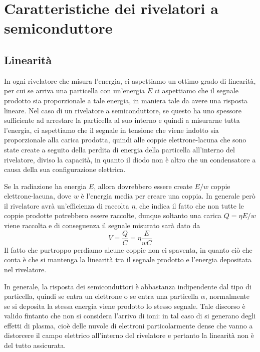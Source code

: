 \section{Caratteristiche dei rivelatori a semiconduttore}

\subsection{Linearità}
In ogni rivelatore che misura l'energia, ci aspettiamo un ottimo grado di linearità, per cui se arriva una particella con un'energia $E$ ci aspettiamo che il segnale prodotto sia proporzionale a tale energia, in maniera tale da avere una risposta lineare. Nel caso di un rivelatore a semiconduttore, se questo ha uno spessore sufficiente ad arrestare la particella al suo interno e quindi a misurarne tutta l'energia, ci aspettiamo che il segnale in tensione che viene indotto sia proporzionale alla carica prodotta, quindi alle coppie elettrone-lacuna che sono state create a seguito della perdita di energia della particella all'interno del rivelatore, diviso la capacità, in quanto il diodo non è altro che un condensatore a causa della sua configurazione elettrica.

Se la radiazione ha energia $E$, allora dovrebbero essere create $E/w$ coppie elettrone-lacuna, dove $w$ è l'energia media per creare una coppia. In generale però il rivelatore avrà un'efficienza di raccolta $\eta$, che indica il fatto che non tutte le coppie prodotte potrebbero essere raccolte, dunque soltanto una carica $Q=\eta E/w$ viene raccolta e di conseguenza il segnale misurato sarà dato da
\begin{equation*}
   V
   =\frac{Q}{C}
   =\eta \frac{E}{w C}
\end{equation*}
Il fatto che purtroppo perdiamo alcune coppie non ci spaventa, in quanto ciò che conta è che si mantenga la linearità tra il segnale prodotto e l'energia depositata nel rivelatore.

In generale, la risposta dei semiconduttori è abbastanza indipendente dal tipo di particella, quindi se entra un elettrone o se entra una particella $\alpha$, normalmente se si deposita la stessa energia viene prodotto lo stesso segnale. Tale discorso è valido fintanto che non si considera l'arrivo di ioni: in tal caso di si generano degli effetti di plasma, cioè delle nuvole di elettroni particolarmente dense che vanno a distorcere il campo elettrico all'interno del rivelatore e pertanto la linearità non è del tutto assicurata.

